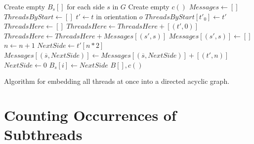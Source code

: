\begin{algorithm}[H]
\begin{algorithmic}
	\State {}
    \State {}
    \State Create empty $B_s[]$ for each side $s$ in $G$
    \State Create empty $c()$
    	\State $Messages \gets []$
    	\State $ThreadsByStart \gets []$
        	\State $t' \gets t$ in orientation $o$
    		\State $ThreadsByStart[t'_{0}] \gets t'$
            \State {} \State {}
    	\EndFor
        	\State $ThreadsHere \gets []$
            	\State $ThreadsHere \gets ThreadsHere + [(t', 0)]$
            \EndFor
            	\State {}
            	\State $ThreadsHere \gets ThreadsHere + Messages[(s', s)]$
                \State $Messages[(s', s)] \gets []$
            \EndFor
            	\State $n \gets n + 1$
                	\State $NextSide \gets t'[n * 2]$
                    \State $Messages[(\overline{s}, NextSide)] \gets Messages[(\overline{s}, NextSide)] + [(t', n)]$
                	\State {}
                \Else
                	\State $NextSide \gets 0$
                \EndIf
            	\State $B_s[i] \gets NextSide$
            \EndFor
        \EndFor
    \EndFor
    \State \Return $B[], c()$
\EndFunction
\end{algorithmic}
\caption[Algorithm for embedding all threads at once into a directed acyclic graph]{Algorithm for embedding all threads at once into a directed acyclic graph.}
\label{alg:dagEmbed}
\end{algorithm}

\section{Counting Occurrences of Subthreads}

